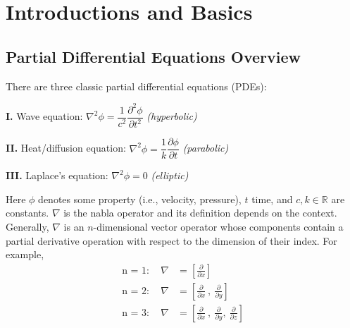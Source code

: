 
\chapter{Introductions and Basics}
\label{chpt:intro2Classs}

\section{Partial Differential Equations Overview}

There are three classic partial differential equations (PDEs):

\vspace{0.5em}

\hspace{2em} \textbf{I.}  Wave equation: \hspace{5.5em} $\nabla^2 \phi = \dfrac{1}{c^2} \dfrac{\partial^2 \phi}{\partial t^2} $  \hspace{2.2em} \emph{(hyperbolic)}

\vspace{0.8em}

\hspace{2em}  \textbf{II.}  Heat/diffusion equation: \hspace{1em} $\nabla^2 \phi = \dfrac{1}{k} \dfrac{\partial \phi}{\partial t}$  \hspace{3em} \emph{(parabolic)}

\vspace{0.8em}

\hspace{2em}  \textbf{III.}  Laplace's equation: \hspace{3.2em} $\nabla^2 \phi = 0$  \hspace{4.8em} \emph{(elliptic)}


\noindent Here $\phi$ denotes some property (i.e., velocity, pressure), $t$ time, and $c,k \in \mathbb{R}$ are constants. $\nabla$ is the nabla operator and its definition depends on the context. Generally, $\nabla$  is an $n$-dimensional vector operator whose components contain a partial derivative operation with respect to the dimension of their index. For example,
\begin{align*}
\text{n = 1}: \hspace{1em} \nabla &= \left[ 
\frac{\partial }{\partial x} \right]\\
\text{n = 2}: \hspace{1em} \nabla &= \left[ 
\frac{\partial }{\partial x} \ ,  \ \frac{\partial }{\partial y} \right] \\
\text{n = 3}: \hspace{1em}  \nabla &= \left[ 
\frac{\partial }{\partial x} \ , \ \frac{\partial }{\partial y}, \ \frac{\partial }{\partial z} \right]
\end{align*}

